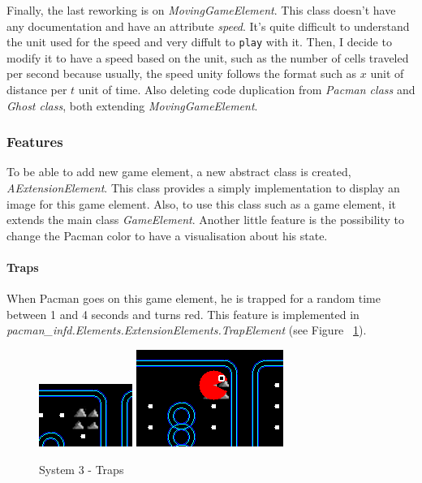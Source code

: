 \documentclass[]{article}
\begin{document}
Finally, the last reworking is on \textit{MovingGameElement}. This class doesn't have any documentation and have an attribute \textit{speed}. It's quite difficult to understand the unit used for the speed and very diffult to \texttt{play} with it. Then, I decide to modify it to have a speed based on the unit, such as the number of cells traveled per second because usually, the speed unity follows the format such as $x$ unit of distance per $t$ unit of time. Also deleting code duplication from \textit{Pacman class} and \textit{Ghost class}, both extending \textit{MovingGameElement}.\\

\subsubsection{Features}

To be able to add new game element, a new abstract class is created, \textit{AExtensionElement}. This class provides a simply implementation to display an image for this game element. Also, to use this class such as a game element, it extends the main class \textit{GameElement}. Another little feature is the possibility to change the Pacman color to have a visualisation about his state.\\

\paragraph{Traps}

When Pacman goes on this game element, he is trapped for a random time between 1 and 4 seconds and turns red. This feature is implemented in \textit{pacman\_infd.Elements.ExtensionElements.TrapElement} (see Figure ~\ref{fig:system3Traps}).\\

\begin{figure}
\centering
    \includegraphics[width=.4\linewidth]{imgs/trapbefore.PNG}
    \includegraphics[width=.4\linewidth]{imgs/trapafter.PNG}
    \caption{System 3 - Traps}
    \label{fig:system3Traps}
\end{figure}
\end{document}
